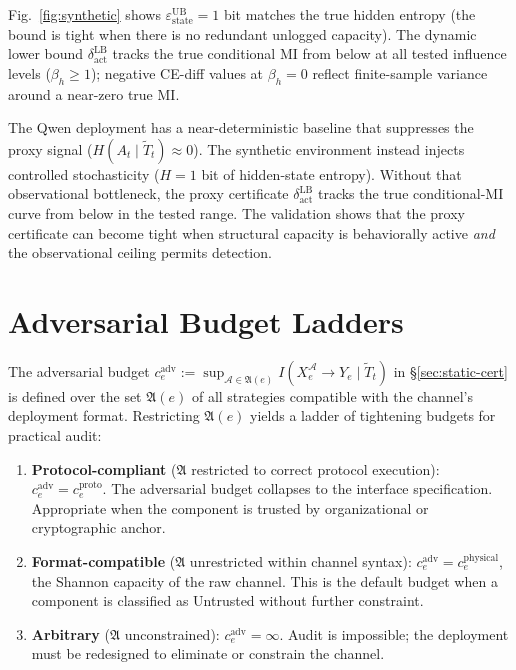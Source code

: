 \documentclass{article}
\begin{document}
Fig.~\ref{fig:synthetic} shows $\varepsilon_\text{state}^\text{UB} = 1$ bit matches the true hidden entropy (the bound is tight when there is no redundant unlogged capacity). The dynamic lower bound $\delta_\text{act}^\text{LB}$ tracks the true conditional MI from below at all tested influence levels ($\beta_h \geq 1$); negative CE-diff values at $\beta_h=0$ reflect finite-sample variance around a near-zero true MI.

The Qwen deployment has a near-deterministic baseline that suppresses the proxy signal ($H(A_t \mid \tilde T_t) \approx 0$). The synthetic environment instead injects controlled stochasticity ($H = 1$ bit of hidden-state entropy). Without that observational bottleneck, the proxy certificate $\delta_\text{act}^\text{LB}$ tracks the true conditional-MI curve from below in the tested range. The validation shows that the proxy certificate can become tight when structural capacity is behaviorally active \emph{and} the observational ceiling permits detection.

\section{Adversarial Budget Ladders}
\label{app:trust-ladders}

The adversarial budget $c_e^{\text{adv}} := \sup_{\mathcal{A} \in \mathfrak{A}(e)} I(X_e^{\mathcal{A}} \to Y_e \mid \tilde T_t)$ in \S\ref{sec:static-cert} is defined over the set $\mathfrak{A}(e)$ of all strategies compatible with the channel's deployment format. Restricting $\mathfrak{A}(e)$ yields a ladder of tightening budgets for practical audit:

\begin{enumerate}
  \item \textbf{Protocol-compliant} ($\mathfrak{A}$ restricted to correct protocol execution): $c_e^{\text{adv}} = c_e^{\text{proto}}$. The adversarial budget collapses to the interface specification. Appropriate when the component is trusted by organizational or cryptographic anchor.
  \item \textbf{Format-compatible} ($\mathfrak{A}$ unrestricted within channel syntax): $c_e^{\text{adv}} = c_e^{\text{physical}}$, the Shannon capacity of the raw channel. This is the default budget when a component is classified as Untrusted without further constraint.
  \item \textbf{Arbitrary} ($\mathfrak{A}$ unconstrained): $c_e^{\text{adv}} = \infty$. Audit is impossible; the deployment must be redesigned to eliminate or constrain the channel.
\end{enumerate}
\end{document}
